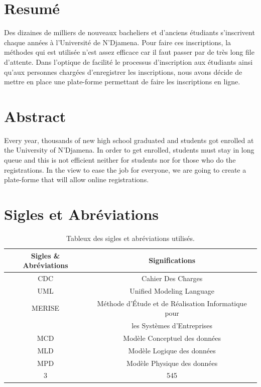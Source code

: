 \documentclass[12pt,a4paper]{article}
\begin{document}
	\newpage
	\section*{Resumé}
	Des dizaines de milliers de nouveaux bacheliers et d'anciens étudiants s’inscrivent chaque années à l’Université de N’Djamena. Pour faire ces inscriptions, la méthodes qui est utilisée n’est assez efficace car il faut passer par de très long file d’attente. Dans l’optique de facilité le processus d’inscription aux étudiants ainsi qu’aux personnes chargées d’enregistrer les inscriptions, nous avons décide de mettre en place une plate-forme permettant de faire les inscriptions en ligne.
	
	\section*{Abstract}
	Every year, thousands of new high school graduated and students got enrolled at the University of N'Djamena. In order to get enrolled, students must stay in long queue and this is not efficient neither for students nor for those who do the registrations. In the view to ease the job for everyone, we are going to create a plate-forme that will allow online registrations.
	
	\newpage
	\listoffigures
	\listoftables
	
	\newpage
	\section*{Sigles et Abréviations}
	\begin{table}[h!]
		\centering
		\begin{tabular}{||c | c||} 
			\hline
			Sigles \& Abréviations & Significations \\ [0.5ex] 
			\hline \hline
			CDC & Cahier Des Charges \\
			\hline 
			UML & Unified Modeling Language \\
			\hline
			MERISE & Méthode d’Étude et de Réalisation Informatique pour\\ & les Systèmes d’Entreprises \\
			\hline
			MCD & Modèle Conceptuel des données \\
			\hline
			MLD & Modèle Logique des données \\
			\hline
			MPD & Modèle Physique des données \\
			\hline
			3 & 545 \\
			\hline
		\end{tabular}
		\caption{Tableux des sigles et abréviations utilisés.}
		\label{table:data}
	\end{table}
\end{document}

